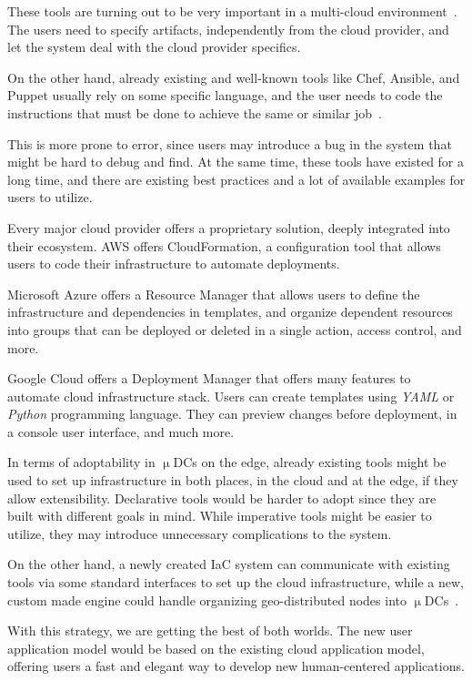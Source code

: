 These tools are turning out to be very important in a multi-cloud environment~\cite{StoicaS21}. The users need to specify artifacts, independently from the cloud provider, and let the system deal with the cloud provider specifics.

On the other hand, already existing and well-known tools like Chef, Ansible, and Puppet usually rely on some specific language, and the user needs to code the instructions that must be done to achieve the same or similar job~\cite{RahmanMW19}.

This is more prone to error, since users may introduce a bug in the system that might be hard to debug and find. At the same time, these tools have existed for a long time, and there are existing best practices and a lot of available examples for users to utilize.

Every major cloud provider offers a proprietary solution, deeply integrated into their ecosystem. AWS offers CloudFormation, a configuration tool that allows users to code their infrastructure to automate deployments.

Microsoft Azure offers a Resource Manager that allows users to define the infrastructure and dependencies in templates, and organize dependent resources into groups that can be deployed or deleted in a single action, access control, and more.

Google Cloud offers a Deployment Manager that offers many features to automate cloud infrastructure stack. Users can create templates using \emph{YAML} or \emph{Python} programming language. They can preview changes before deployment, in a console user interface, and much more.

In terms of adoptability in $\upmu$DCs on the edge, already existing tools might be used to set up infrastructure in both places, in the cloud and at the edge, if they allow extensibility. Declarative tools would be harder to adopt since they are built with different goals in mind. While imperative tools might be easier to utilize, they may introduce unnecessary complications to the system.

On the other hand, a newly created IaC system can communicate with existing tools via some standard interfaces to set up the cloud infrastructure, while a new, custom made engine could handle organizing geo-distributed nodes into $\upmu$DCs~\cite{SimicSensors}.

With this strategy, we are getting the best of both worlds. The new user application model would be based on the existing cloud application model, offering users a fast and elegant way to develop new human-centered applications.

